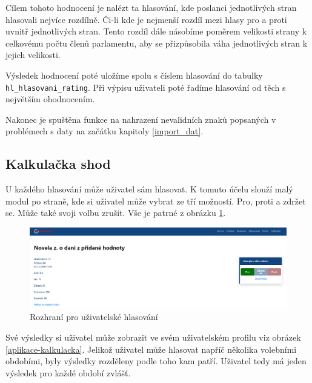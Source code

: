 \par Cílem tohoto hodnocení je nalézt ta hlasování, kde poslanci jednotlivých stran hlasovali nejvíce rozdílně. Či-li kde je nejmenší rozdíl mezi hlasy pro a proti uvnitř jednotlivých stran. Tento rozdíl dále násobíme poměrem velikosti strany k celkovému počtu členů parlamentu, aby se přizpůsobila váha jednotlivých stran k jejich velikosti.  

\par Výsledek hodnocení poté uložíme spolu s číslem hlasování do tabulky \texttt{hl\_hlasovani\_rating}. Při výpisu uživateli poté řadíme hlasování od těch s největším ohodnocením.\\

\par Nakonec je spuštěna funkce na nahrazení nevalidních znaků popsaných v problémech s daty na začátku kapitoly \ref{import_dat}. 

\subsection{Kalkulačka shod}
U každého hlasování může uživatel sám hlasovat. K tomuto účelu slouží malý modul po straně, kde si uživatel může vybrat ze tří možností. Pro, proti a zdržet se. Může také svoji volbu zrušit. Vše je patrné z obrázku \ref{fig:aplikace-hlasovani}.

\begin{figure}
    \centering
    \includegraphics[width=1\textwidth]{obrazky-figures/aplikace-hlasovani.png}
    \caption{Rozhraní pro uživatelské hlasování}
    \label{fig:aplikace-hlasovani}
\end{figure}

\par Své výsledky si uživatel může zobrazit ve svém uživatelském profilu viz obrázek \ref{aplikace-kalkulacka}. Jelikož uživatel může hlasovat napříč několika volebními obdobími, byly výsledky rozděleny podle toho kam patří. Uživatel tedy má jeden výsledek pro každé období zvlášť. 

